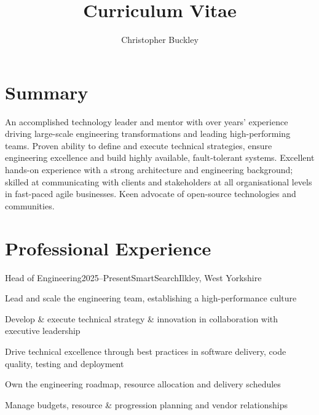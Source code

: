 \documentclass{cv}
\title{Curriculum Vitae}
\author{Christopher Buckley}
\begin{document}

\section{Summary}

An accomplished technology leader and mentor with over  years' experience driving large-scale
engineering transformations and leading high-performing teams. Proven ability to define and execute
technical strategies, ensure engineering excellence and build highly available, fault-tolerant
systems. Excellent hands-on experience with a strong architecture and engineering background;
skilled at communicating with clients and stakeholders at all organisational levels in fast-paced
agile businesses. Keen advocate of open-source technologies and communities.


\section{Professional Experience}

\begin{experience}{Head of Engineering}{2025--Present}{SmartSearch}{Ilkley, West Yorkshire}
\item Lead and scale the engineering team, establishing a high-performance culture
\item Develop \& execute technical strategy \& innovation in collaboration with executive leadership
\item Drive technical excellence through best practices in software delivery, code quality, testing and deployment
\item Own the engineering roadmap, resource allocation and delivery schedules
\item Manage budgets, resource \& progression planning and vendor relationships
\end{experience}
\end{document}
